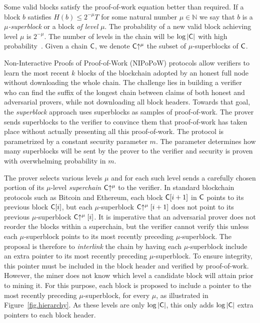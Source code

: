 Some valid blocks satisfy the proof-of-work equation better than required. If
a block $b$ satisfies $H(b) \leq 2^{-\mu} T$ for some natural number
$\mu \in \mathbb{N}$ we say that $b$ is a \emph{$\mu$-superblock} or a block
\emph{of level} $\mu$. The probability of a new valid block achieving level
$\mu$ is $2^{-\mu}$. The number of levels in the chain will be $\log|\mathsf{C}|$
with high probability~\cite{popow}. Given a chain $\mathsf{C}$, we denote
$\mathsf{C}\negthickspace\uparrow^\mu$ the subset of $\mu$-superblocks of $\mathsf{C}$.

Non-Interactive Proofs of Proof-of-Work (NIPoPoW) protocols allow verifiers to
learn the most recent $k$ blocks of the blockchain adopted by an honest full
node without downloading the whole chain. The challenge lies in building a
verifier who can find the suffix of the longest chain between claims of both
honest and adversarial provers, while not downloading all block headers. Towards
that goal, the \emph{superblock} approach uses superblocks as samples of
proof-of-work. The prover sends superblocks to the verifier to convince them
that proof-of-work has taken place without actually presenting all this
proof-of-work. The protocol is parametrized by a constant security parameter
$m$. The parameter determines how many superblocks will be sent by the prover to
the verifier and security is proven with overwhelming probability in $m$.

The prover selects various levels $\mu$ and for each such level sends a
carefully chosen portion of its $\mu$-level \emph{superchain}
$\mathsf{C}\negthickspace\uparrow^\mu$ to the verifier. In standard blockchain protocols such as
Bitcoin and Ethereum, each block $\mathsf{C}[i + 1]$ in $\mathsf{C}$ points to its
previous block $\mathsf{C}[i]$, but each $\mu$-superblock $\mathsf{C}\negthickspace\uparrow^\mu[i +
1]$ does not point to its previous $\mu$-superblock $\mathsf{C}\negthickspace\uparrow^\mu[i]$. It
is imperative that an adversarial prover does not reorder the blocks within a
superchain, but the verifier cannot verify this unless each $\mu$-superblock
points to its most recently preceding $\mu$-superblock. The proposal is
therefore to \emph{interlink} the chain by having each $\mu$-superblock include
an extra pointer to its most recently preceding $\mu$-superblock. To ensure
integrity, this pointer must be included in the block header and verified by
proof-of-work. However, the miner does not know which level a candidate block
will attain prior to mining it. For this purpose, each block is proposed to
include a pointer to the most recently preceding $\mu$-superblock, for every
$\mu$, as illustrated in Figure~\ref{fig.hierarchy}. As these levels are only
$\log|\mathsf{C}|$, this only adds $\log|\mathsf{C}|$ extra pointers to each block
header.

